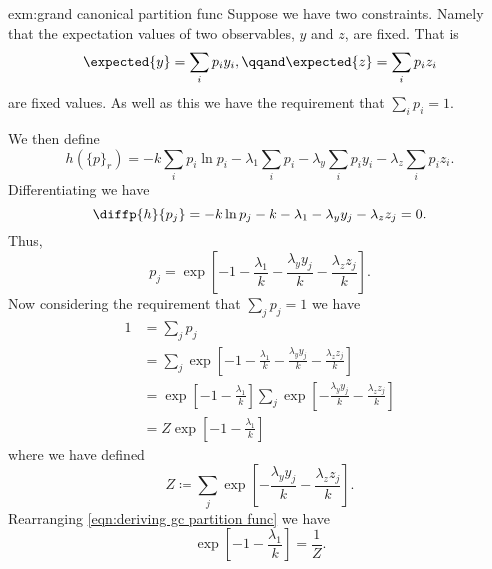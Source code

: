 \documentclass[fleqn]{NotesClass}
\begin{document}
    \begin{exm}{}{exm:grand canonical partition func}
        Suppose we have two constraints.
        Namely that the expectation values of two observables, \(y\) and \(z\), are fixed.
        That is
        \begin{equation}
            \expected{y} = \sum_{i} p_iy_i, \qqand \expected{z} = \sum_{i} p_iz_i
        \end{equation}
        are fixed values.
        As well as this we have the requirement that \(\sum_{i} p_i = 1\).
        
        We then define
        \begin{equation}
            h(\{p\}_r) = -k\sum_{i} p_i\ln p_i - \lambda_1 \sum_i p_i - \lambda_y \sum_i p_iy_i - \lambda_z \sum_i p_i z_i.
        \end{equation}
        Differentiating we have
        \begin{equation}
            \diffp{h}{p_j} = -k\ln p_j - k - \lambda_1 - \lambda_y y_j - \lambda_z z_j = 0.
        \end{equation}
        Thus,
        \begin{equation}
            p_j = \exp\left[ -1 - \frac{\lambda_1}{k} - \frac{\lambda_y y_j}{k} - \frac{\lambda_z z_j}{k} \right].
        \end{equation}
        Now considering the requirement that \(\sum_j p_j = 1\) we have
        \begin{align}
            1 &= \sum_j p_j\\
            &= \sum_j \exp\left[ -1 - \frac{\lambda_1}{k} - \frac{\lambda_y y_j}{k} - \frac{\lambda_z z_j}{k} \right]\\
            &= \exp\left[ -1 - \frac{\lambda_1}{k} \right] \sum_j \exp\left[ -\frac{\lambda_y y_j}{k} - \frac{\lambda_z z_j}{k} \right]\\
            &= Z \exp\left[ -1 - \frac{\lambda_1}{k} \right]\label{eqn:deriving gc partition func}
        \end{align}
        where we have defined
        \begin{equation}
            Z \coloneqq \sum_j \exp\left[ -\frac{\lambda_y y_j}{k} - \frac{\lambda_z z_j}{k} \right].
        \end{equation}
        Rearranging \cref{eqn:deriving gc partition func} we have
        \begin{equation}
            \exp\left[ -1 - \frac{\lambda_1}{k} \right] = \frac{1}{Z}.
        \end{equation}

\end{exm}
\end{document}
